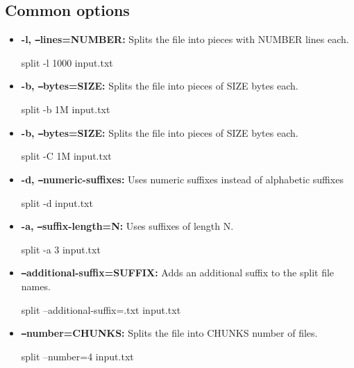 \documentclass{report}
\begin{document}
    \subsection{Common options}
    \begin{itemize}
        \item \textbf{-l, \texttt{--}lines=NUMBER:} Splits the file into pieces with NUMBER lines each.
            \bigbreak \noindent 
            \begin{bashcode}
            split -l 1000 input.txt
            \end{bashcode}
        \item \textbf{-b, \texttt{--}bytes=SIZE:} Splits the file into pieces of SIZE bytes each.
            \bigbreak \noindent 
            \begin{bashcode}
            split -b 1M input.txt
            \end{bashcode}
        \item \textbf{-b, \texttt{--}bytes=SIZE:} Splits the file into pieces of SIZE bytes each.
            \bigbreak \noindent 
            \begin{bashcode}
            split -C 1M input.txt
            \end{bashcode}
        \item \textbf{-d, \texttt{--}numeric-suffixes:} Uses numeric suffixes instead of alphabetic suffixes
            \bigbreak \noindent 
            \begin{bashcode}
            split -d input.txt
            \end{bashcode}
        \item \textbf{-a, \texttt{--}suffix-length=N:} Uses suffixes of length N.
            \bigbreak \noindent 
            \begin{bashcode}
            split -a 3 input.txt
            \end{bashcode}
        \item \textbf{\texttt{--}additional-suffix=SUFFIX:} Adds an additional suffix to the split file names.
            \bigbreak \noindent 
            \begin{bashcode}
            split --additional-suffix=.txt input.txt
            \end{bashcode}
        \item \textbf{\texttt{--}number=CHUNKS:} Splits the file into CHUNKS number of files.
            \bigbreak \noindent 
            \begin{bashcode}
            split --number=4 input.txt
            \end{bashcode}
    \end{itemize}
\end{document}
